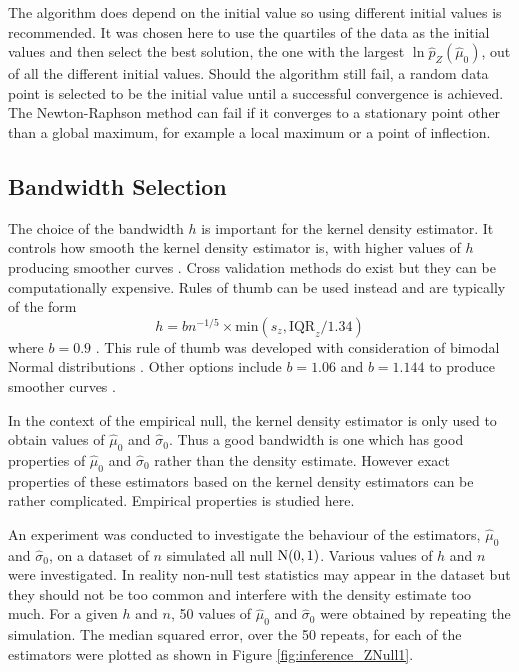 The algorithm does depend on the initial value so using different initial values is recommended. It was chosen here to use the quartiles of the data as the initial values and then select the best solution, the one with the largest $\ln\widehat{p}_Z\left(\widehat{\mu}_0\right)$, out of all the different initial values. Should the algorithm still fail, a random data point is selected to be the initial value until a successful convergence is achieved. The Newton-Raphson method can fail if it converges to a stationary point other than a global maximum, for example a local maximum or a point of inflection. 

\subsection{Bandwidth Selection}

The choice of the bandwidth $h$ is important for the kernel density estimator. It controls how smooth the kernel density estimator is, with higher values of $h$ producing smoother curves \citep{friedman2001elements}. Cross validation methods do exist \citep{bowman1984alternative, sheather2004density} but they can be computationally expensive. Rules of thumb \citep{silverman1986density, sheather2004density} can be used instead and are typically of the form
\begin{equation}
	h = bn^{-1/5}\times\text{min}\left(s_z,\text{IQR}_z/1.34\right)
\end{equation}
where $b=0.9$ \citep{silverman1986density}. This rule of thumb was developed with consideration of bimodal Normal distributions \citep{silverman1986density}. Other options include $b=1.06$ and $b=1.144$ to produce smoother curves \citep{sheather2004density}.

In the context of the empirical null, the kernel density estimator is only used to obtain values of $\widehat{\mu}_0$ and $\widehat{\sigma}_0$. Thus a good bandwidth is one which has good properties of $\widehat{\mu}_0$ and $\widehat{\sigma}_0$ rather than the density estimate. However exact properties of these estimators based on the kernel density estimators can be rather complicated. Empirical properties is studied here.

An experiment was conducted to investigate the behaviour of the estimators, $\widehat{\mu}_0$ and $\widehat{\sigma}_0$, on a dataset of $n$ simulated all null $\operatorname{N}(0,1)$. Various values of $h$ and $n$ were investigated. In reality non-null test statistics may appear in the dataset but they should not be too common and interfere with the density estimate too much. For a given $h$ and $n$, 50 values of $\widehat{\mu}_0$ and $\widehat{\sigma}_0$ were obtained by repeating the simulation. The median squared error, over the 50 repeats, for each of the estimators were plotted as shown in Figure \ref{fig:inference_ZNull1}.


